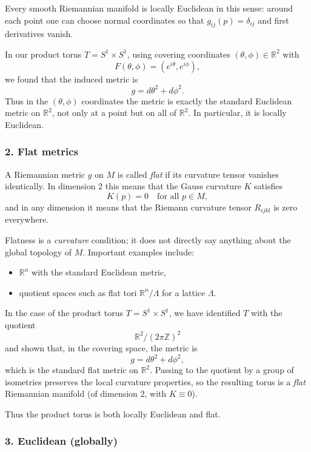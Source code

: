 \documentclass[12pt,a4paper]{article}
\theoremstyle{plain}
\theoremstyle{definition}      %
\begin{document}
Every smooth Riemannian manifold is locally Euclidean in this sense:
around each point one can choose normal coordinates so that $g_{ij}(p)
= \delta_{ij}$ and first derivatives vanish.

In our product torus $T = S^{1}\times S^{1}$, using covering coordinates
$(\theta,\phi)\in\mathbb{R}^{2}$ with
\[
F(\theta,\phi) = (e^{i\theta},e^{i\phi}),
\]
we found that the induced metric is
\[
g = d\theta^{2} + d\phi^{2}.
\]
Thus in the $(\theta,\phi)$ coordinates the metric is exactly the
standard Euclidean metric on $\mathbb{R}^{2}$, not only at a point but
on all of $\mathbb{R}^{2}$.  In particular, it is locally Euclidean.

\subsubsection*{2. Flat metrics}

A Riemannian metric $g$ on $M$ is called \emph{flat} if its curvature
tensor vanishes identically.  In dimension $2$ this means that the Gauss
curvature $K$ satisfies
\[
K(p) = 0
\quad\text{for all } p\in M,
\]
and in any dimension it means that the Riemann curvature tensor
$R_{ijkl}$ is zero everywhere.

Flatness is a \emph{curvature} condition; it does not directly say
anything about the global topology of $M$.  Important examples include:
\begin{itemize}
	\item $\mathbb{R}^{n}$ with the standard Euclidean metric,
	\item quotient spaces such as flat tori
	$\mathbb{R}^{n}/\Lambda$ for a lattice $\Lambda$.
\end{itemize}

In the case of the product torus $T = S^{1}\times S^{1}$, we have
identified $T$ with the quotient
\[
\mathbb{R}^{2}/(2\pi\mathbb{Z})^{2}
\]
and shown that, in the covering space, the metric is
\[
g = d\theta^{2} + d\phi^{2},
\]
which is the standard flat metric on $\mathbb{R}^{2}$.  Passing to the
quotient by a group of isometries preserves the local curvature
properties, so the resulting torus is a \emph{flat} Riemannian manifold
(of dimension $2$, with $K\equiv 0$).

Thus the product torus is both locally Euclidean and flat.

\subsubsection*{3. Euclidean (globally)}
\end{document}
